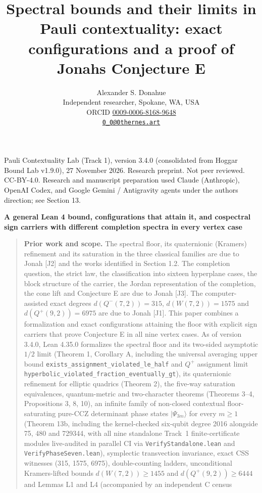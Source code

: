\documentclass[11pt,a4paper]{article}
\title{Spectral bounds and their limits in Pauli contextuality: exact configurations and a proof of Jonah\textquotesingle s Conjecture E}
\author{Alexander S. Donahue\\Independent researcher, Spokane, WA, USA\\ORCID \href{https://orcid.org/0009-0006-8168-9648}{0009-0006-8168-9648}\\\href{mailto:0_0@0thernes.art}{\texttt{0\_0@0thernes.art}}}
\date{}
\begin{document}
\maketitle

Pauli Contextuality Lab (Track 1), version 3.4.0 (consolidated from Hoggar Bound Lab v1.9.0), 27 November 2026. Research preprint. Not peer reviewed. CC-BY-4.0.
Research and manuscript preparation used Claude (Anthropic), OpenAI Codex, and Google Gemini / Antigravity agents under the author\textquotesingle s direction; see Section 13.

\textbf{A general Lean 4 bound, configurations that attain it, and cospectral sign carriers with different completion spectra in every vertex case}

\begin{quote}
\textbf{Prior work and scope.} The spectral floor, its quaternionic (Kramers) refinement and its saturation in
the three classical families are due to Jonah {[}J2{]} and the works identified in Section 1.2. The completion
question, the strict law, the classification into sixteen hyperplane cases, the block structure of the
carrier, the Jordan representation of the completion, the cone lift and Conjecture E are due to Jonah {[}J3{]}.
The computer-assisted exact degrees \(d(Q^-(7,2))=315\), \(d(W(7,2))=1575\) and \(d(Q^+(9,2))=6975\) are due to
Jonah {[}J1{]}. This paper combines a formalization and exact configurations attaining the floor with explicit
sign carriers that prove Conjecture E in all nine vertex cases. As of version 3.4.0, Lean 4.35.0 formalizes
the spectral floor and its two-sided asymptotic \(1/2\) limit (Theorem 1, Corollary A, including the
universal averaging upper bound \nolinkurl{exists_assignment_violated_le_half} and \(Q^+\) assignment limit
\nolinkurl{hyperbolic_violated_fraction_eventually_gt}), its quaternionic refinement
for elliptic quadrics (Theorem 2), the five-way saturation equivalences, quantum-metric and two-character
theorems (Theorems 3--4, Propositions 3, 8, 10), an infinite family of non-closed contextual floor-saturating
pure-CCZ determinant phase states \(|\Psi_{3m}\rangle\) for every \(m\ge1\) (Theorem 13b, including the
kernel-checked six-qubit degree 2016 alongside 75, 480 and 729344, with all nine standalone Track~1
finite-certificate modules live-audited in parallel CI via \nolinkurl{VerifyStandalone.lean} and
\nolinkurl{VerifyPhaseSeven.lean}), symplectic transvection invariance,
exact CSS witnesses (315, 1575, 6975), double-counting ladders, unconditional Kramers-lifted bounds
\(d(W(7,2))\ge1455\) and \(d(Q^+(9,2))\ge6444\) and Lemmas L1 and L4 (accompanied by an independent C census

\end{quote}
\end{document}
